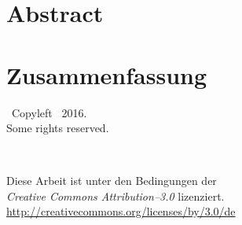 \newpage

\thispagestyle{empty}
\vspace{4cm}
\section*{Abstract}
\ThesisAbstractEnglish

\vspace{3cm}
\section*{Zusammenfassung}
\ThesisAbstractDeutsch

\newpage

\thispagestyle{empty}
\vspace*{0in}
\begin{center}
	{\Large{}}\ Copyleft \ThesisAuthor~2016. \\
  Some rights reserved. \\
  \vspace{1in}
  \begin{minipage}[c]{0.2\linewidth}
    \hfill {\Huge \ccLogo~\ccAttribution}
  \end{minipage}
  \hspace{0.1cm}
  \begin{minipage}[c]{0.7\linewidth}
    Diese Arbeit ist unter den Bedingungen der \\
    \textit{Creative Commons Attribution--3.0} lizenziert. \\
    \url{http://creativecommons.org/licenses/by/3.0/de}
  \end{minipage}
\end{center}
\vspace{6cm}
\ThesisThanks
\clearpage
